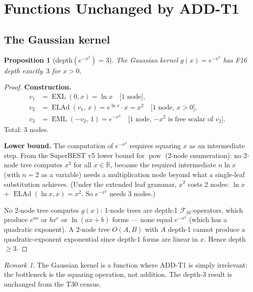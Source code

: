 \documentclass[12pt,a4paper]{article}
\newtheorem{proposition}[theorem]{Proposition}
\theoremstyle{definition}
\theoremstyle{remark}
\newtheorem{remark}[theorem]{Remark}
\newcommand{\EML}{\operatorname{EML}}
\newcommand{\EXL}{\operatorname{EXL}}
\newcommand{\ELAd}{\operatorname{ELAd}}
\newcommand{\powop}{\operatorname{pow}}
\newcommand{\F}{\mathcal{F}_{16}}
\newcommand{\R}{\mathbb{R}}
\begin{document}
\section{Functions Unchanged by ADD-T1}
\label{sec:unchanged}

\subsection{The Gaussian kernel}

\begin{proposition}[depth$(e^{-x^2}) = 3$]
\label{prop:gaussian}
The Gaussian kernel $g(x) = e^{-x^2}$ has F16 depth exactly~$3$ for $x > 0$.
\end{proposition}

\begin{proof}
\textbf{Construction.}
\begin{align*}
  v_1 &= \EXL(0,x) = \ln x \quad\text{[1 node]}, \\
  v_2 &= \ELAd(v_1,\, x) = e^{\ln x} \cdot x = x^2 \quad\text{[1 node, $x>0$]}, \\
  v_3 &= \EML(-v_2,\, 1) = e^{-x^2} \quad\text{[1 node, $-x^2$ is free scalar of $v_2$]}.
\end{align*}
Total: 3 nodes.

\textbf{Lower bound.}
The computation of $e^{-x^2}$ requires squaring $x$ as an intermediate step.
From the SuperBEST v5 lower bound for $\powop$ (2-node enumeration): no
2-node tree computes $x^2$ for all $x\in\R$, because the required intermediate
$n\ln x$ (with $n=2$ as a variable) needs a multiplication node beyond what a
single-leaf substitution achieves.  (Under the extended leaf grammar, $x^2$ costs
2 nodes: $\ln x$ + $\ELAd(\ln x, x) = x^2$.  So $e^{-x^2}$ needs 3 nodes.)

No 2-node tree computes $g(x)$: 1-node trees are depth-1 $\F$-operators, which
produce $e^{ax}$ or $bx^r$ or $\ln(ax+b)$ forms --- none equal $e^{-x^2}$
(which has a quadratic exponent).  A 2-node tree $O(A,B)$ with $A$ depth-1
cannot produce a quadratic-exponent exponential since depth-1 forms are linear
in $x$.  Hence depth$\geq 3$.
\end{proof}

\begin{remark}
The Gaussian kernel is a function where ADD-T1 is simply irrelevant: the
bottleneck is the squaring operation, not addition.  The depth-3 result is
unchanged from the T30 census.
\end{remark}
\end{document}
